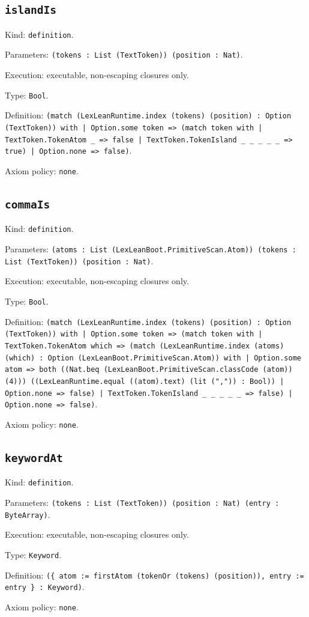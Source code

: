 \documentclass[11pt]{article}
\begin{document}
\subsection*{\texttt{islandIs}}
\noindent Kind: \texttt{definition}.\par
\noindent Parameters: \texttt{(tokens : List (TextToken)) (position : Nat)}.\par
\noindent Execution: executable, non-escaping closures only.\par
\noindent Type: \texttt{Bool}.\par
\noindent Definition: \texttt{(match (LexLeanRuntime.index (tokens) (position) : Option (TextToken)) with | Option.some token => (match token with | TextToken.TokenAtom \_ => false | TextToken.TokenIsland \_ \_ \_ \_ \_ => true) | Option.none => false)}.\par
\noindent Axiom policy: \texttt{none}.\par
\subsection*{\texttt{commaIs}}
\noindent Kind: \texttt{definition}.\par
\noindent Parameters: \texttt{(atoms : List (LexLeanBoot.PrimitiveScan.Atom)) (tokens : List (TextToken)) (position : Nat)}.\par
\noindent Execution: executable, non-escaping closures only.\par
\noindent Type: \texttt{Bool}.\par
\noindent Definition: \texttt{(match (LexLeanRuntime.index (tokens) (position) : Option (TextToken)) with | Option.some token => (match token with | TextToken.TokenAtom which => (match (LexLeanRuntime.index (atoms) (which) : Option (LexLeanBoot.PrimitiveScan.Atom)) with | Option.some atom => both ((Nat.beq (LexLeanBoot.PrimitiveScan.classCode (atom)) (4))) ((LexLeanRuntime.equal ((atom).text) (lit (",")) : Bool)) | Option.none => false) | TextToken.TokenIsland \_ \_ \_ \_ \_ => false) | Option.none => false)}.\par
\noindent Axiom policy: \texttt{none}.\par
\subsection*{\texttt{keywordAt}}
\noindent Kind: \texttt{definition}.\par
\noindent Parameters: \texttt{(tokens : List (TextToken)) (position : Nat) (entry : ByteArray)}.\par
\noindent Execution: executable, non-escaping closures only.\par
\noindent Type: \texttt{Keyword}.\par
\noindent Definition: \texttt{(\{ atom := firstAtom (tokenOr (tokens) (position)), entry := entry \} : Keyword)}.\par
\noindent Axiom policy: \texttt{none}.\par
\end{document}

